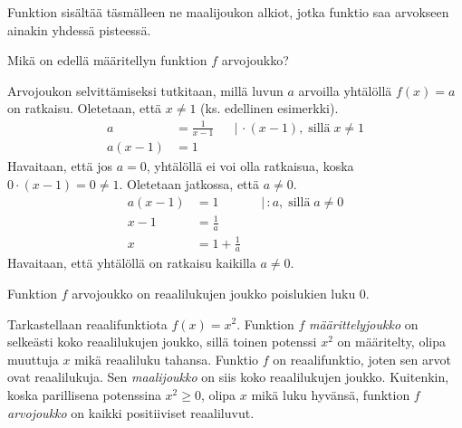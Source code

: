 Funktion  sisältää täsmälleen ne maalijoukon alkiot,
jotka funktio saa arvokseen ainakin yhdessä pisteessä.

\begin{esimerkki}
	Mikä on edellä määritellyn funktion $f$ arvojoukko?
	\begin{esimratk}
		Arvojoukon selvittämiseksi tutkitaan, millä luvun $a$ arvoilla
		yhtälöllä $f(x) = a$ on ratkaisu. Oletetaan, että $x \neq 1$ (ks. edellinen esimerkki).
		\begin{align*}
			a &= \frac{1}{x-1} & &| \, \cdot (x-1), \; \text{sillä} \; x \neq 1 \\
			a(x-1) &= 1
		\end{align*}
		Havaitaan, että jos $a = 0$, yhtälöllä ei voi olla ratkaisua, koska $0 \cdot (x-1) = 0 \neq 1$.
		Oletetaan jatkossa, että $a \neq 0$.
		\begin{align*}
			a(x-1) &= 1 & &| \, : a, \; \text{sillä} \; a \neq 0 \\
			x-1 &= \frac{1}{a} \\
			x &= 1+\frac{1}{a}
		\end{align*}
		Havaitaan, että yhtälöllä on ratkaisu kaikilla $a \neq 0$.
	\end{esimratk}
	\begin{esimvast}
		Funktion $f$ arvojoukko on reaalilukujen joukko poislukien luku $0$.
	\end{esimvast}
\end{esimerkki}

\begin{esimerkki}
	Tarkastellaan reaalifunktiota $f(x)=x^2$. Funktion $f$ \textit{määrittelyjoukko} on selkeästi koko reaalilukujen joukko, sillä toinen potenssi $x^2$ 
	on määritelty, olipa muuttuja $x$ mikä reaaliluku tahansa. Funktio $f$ on reaalifunktio, joten sen arvot ovat reaalilukuja. Sen \textit{maalijoukko} on siis 
	koko reaalilukujen joukko. Kuitenkin, koska parillisena potenssina $x^{2}\geq0$, olipa $x$ mikä luku hyvänsä, funktion $f$ \textit{arvojoukko} on kaikki 
	positiiviset reaaliluvut.
	
	\begin{center}
		\begin{kuvaajapohja}{0.7}{-5}{5}{-2}{8}
		\end{kuvaajapohja}
	\end{center}
	
	
\end{esimerkki}
	
